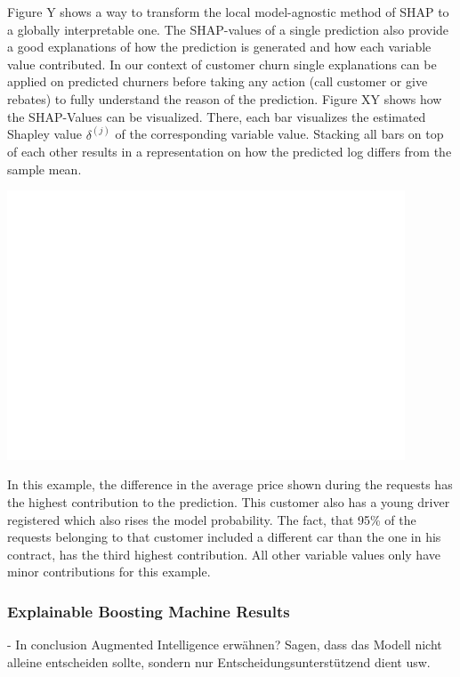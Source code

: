 \documentclass[12pt,titlepage]{article}
\begin{document}
Figure Y shows a way to transform the local model-agnostic method of SHAP to a globally interpretable one. The SHAP-values of a single prediction also provide a good explanations of how the prediction is generated and how each variable value contributed. In our context of customer churn single explanations can be applied on predicted churners before taking any action (call customer or give rebates) to fully understand the reason of the prediction. Figure XY shows how the SHAP-Values can be visualized. There, each bar visualizes the estimated Shapley value $\delta^{(j)}$ of the corresponding variable value. Stacking all bars on top of each other results in a representation on how the predicted log differs from the sample mean.\\
\centerline{\includegraphics[height=8cm]{shap_waterfall_example.png}}
In this example, the difference in the average price shown during the requests has the highest contribution to the prediction. This customer also has a young driver registered which also rises the model probability. The fact, that 95\% of the requests belonging to that customer included a different car than the one in his contract, has the third highest contribution. All other variable values only have minor contributions for this example. \\

\subsubsection*{Explainable Boosting Machine Results}


- In conclusion Augmented Intelligence erwähnen? Sagen, dass das Modell nicht alleine entscheiden sollte, sondern nur Entscheidungsunterstützend dient usw.
\newpage

\thispagestyle{empty}

\printbibliography

\vspace*{6mm}
\end{document}
